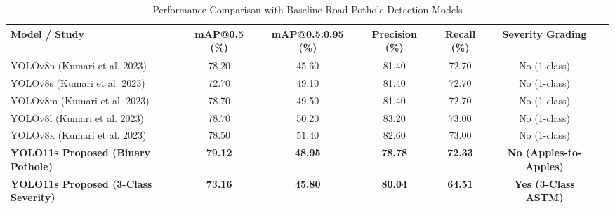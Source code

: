 \begin{table}[t]
\centering
\caption{Performance Comparison with Baseline Road Pothole Detection Models}
\label{tab:pothole_comparison}
\begin{tabular}{lcccccc}
\hline
\textbf{Model / Study} & \textbf{mAP@0.5 (\%)} & \textbf{mAP@0.5:0.95 (\%)} & \textbf{Precision (\%)} & \textbf{Recall (\%)} & \textbf{Severity Grading} \\
\hline
YOLOv8n (Kumari et al. 2023) & 78.20 & 45.60 & 81.40 & 72.70 & No (1-class) \\
YOLOv8s (Kumari et al. 2023) & 72.70 & 49.10 & 81.40 & 72.70 & No (1-class) \\
YOLOv8m (Kumari et al. 2023) & 78.70 & 49.50 & 81.40 & 72.70 & No (1-class) \\
YOLOv8l (Kumari et al. 2023) & 78.70 & 50.20 & 83.20 & 73.00 & No (1-class) \\
YOLOv8x (Kumari et al. 2023) & 78.50 & 51.40 & 82.60 & 73.00 & No (1-class) \\
\textbf{YOLO11s Proposed (Binary Pothole)} & \textbf{79.12} & \textbf{48.95} & \textbf{78.78} & \textbf{72.33} & \textbf{No (Apples-to-Apples)} \\
\textbf{YOLO11s Proposed (3-Class Severity)} & \textbf{73.16} & \textbf{45.80} & \textbf{80.04} & \textbf{64.51} & \textbf{Yes (3-Class ASTM)} \\
\hline
\end{tabular}
\end{table}
